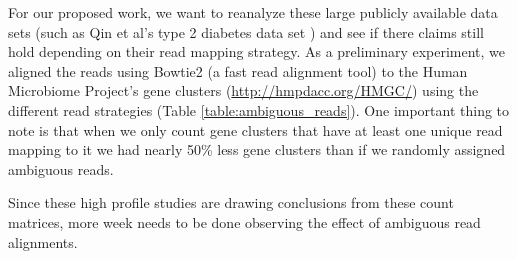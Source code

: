 For our proposed work, we want to reanalyze these large publicly available data sets (such as Qin et al's type 2 diabetes data set \cite{qin_metagenome-wide_2012}) and see if there claims still hold depending on their read mapping strategy.
As a preliminary experiment, we aligned the reads using Bowtie2 (a fast read alignment tool)\cite{langmead2012fast} to the Human Microbiome Project's gene clusters (\url{http://hmpdacc.org/HMGC/}) using the different read strategies (Table \ref{table:ambiguous_reads}).
One important thing to note is that when we only count gene clusters that have at least one unique read mapping to it we had nearly 50\% less gene clusters than if we randomly assigned ambiguous reads.

Since these high profile studies are drawing conclusions from these count matrices, more week needs to be done observing the effect of ambiguous read alignments. 
